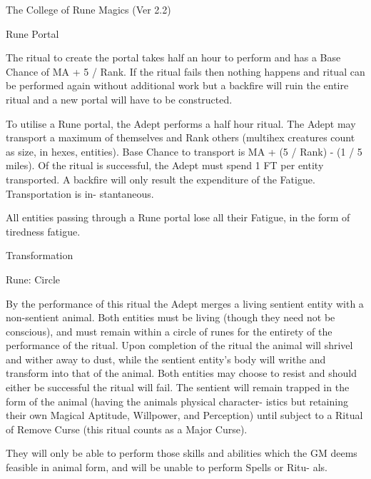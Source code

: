 \begin{Chapter}{The College of Rune Magics (Ver 2.2)}
\begin{ritual}[R-6]{Rune Portal }
\begin{effects}
The ritual to create the portal takes half an hour to 
perform and has a Base Chance of MA + 5 / Rank. 
If  the  ritual  fails  then  nothing  happens  and  ritual 
can  be  performed  again  without  additional  work 
but a backfire will ruin the entire ritual and a new 
portal will have to be constructed. 

To utilise a Rune portal, the Adept performs a half 
hour  ritual.  The  Adept  may  transport  a  maximum 
of themselves and Rank others (multihex creatures 
count  as  size,  in  hexes,  entities).  Base  Chance  to 
transport is MA + (5 / Rank) - (1 / 5 miles). Of the 
ritual is successful, the Adept must spend 1 FT per 
entity  transported.  A  backfire  will  only  result  the 
expenditure  of  the  Fatigue.  Transportation  is  in-
stantaneous. 

All  entities  passing  through  a  Rune  portal  lose  all 
their Fatigue, in the form of tiredness fatigue. 



\end{effects}
\end{ritual}

\begin{ritual}[R-7]{Transformation }

Rune: Circle 
\begin{effects}
By the performance of this ritual the Adept 
merges  a  living  sentient  entity  with  a  non-sentient 
animal.  Both  entities  must  be  living  (though  they 
need  not  be  conscious),  and  must  remain  within  a 
circle  of  runes  for  the  entirety  of  the  performance 
of  the  ritual.  Upon  completion  of  the  ritual  the 
animal will shrivel and wither away  to dust, while 
the sentient entity’s body will writhe and transform 
into that of the animal. Both entities may choose to 
resist and should either be successful the ritual will 
fail. The sentient will remain trapped in the form of 
the animal (having the animals physical character-
istics  but  retaining  their  own  Magical  Aptitude, 
Willpower, and Perception) until subject to a Ritual 
of  Remove  Curse  (this  ritual  counts  as  a  Major 
Curse). 

They  will  only be able to perform those skills and 
abilities  which  the  GM  deems  feasible  in  animal 
form, and will be unable to perform Spells or Ritu-
als. 


\end{effects}
\end{ritual}
\end{Chapter}
